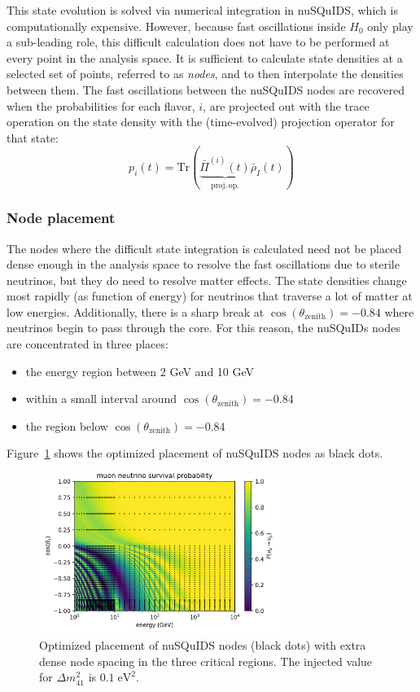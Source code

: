 This state evolution is solved via numerical integration in nuSQuIDS, which is computationally expensive. However, because fast oscillations inside $ H_0$ only play a sub-leading role, this difficult calculation does not have to be performed at every point in the analysis space. It is sufficient to calculate state densities at a selected set of points, referred to as \emph{nodes}, and to then interpolate the densities between them. The fast oscillations between the nuSQuIDS nodes are recovered when the probabilities for each flavor, $i$, are projected out with the trace operation on the state density with the (time-evolved) projection operator for that state:
$$
p_i(t)=\mathrm{Tr}(\underbrace{\bar{\Pi}^{(i)}(t)}_{\mathrm{proj.\,op.}}\bar{\rho}_I(t))
$$

\subsubsection{Node placement}
The nodes where the difficult state integration is calculated need not be placed dense enough in the analysis space to resolve the fast oscillations due to sterile neutrinos, but they do need to resolve matter effects. The state densities change most rapidly (as function of energy) for neutrinos that traverse a lot of matter at low energies. Additionally, there is a sharp break at $\cos(\theta_{\mathrm{zenith}})=-0.84$ where neutrinos begin to pass through the core. For this reason, the nuSQuIDs nodes are concentrated in three places:
\begin{itemize}
    \item the energy region between 2 GeV and 10 GeV
    \item within a small interval around $\cos(\theta_{\mathrm{zenith}})=-0.84$
    \item the region below $\cos(\theta_{\mathrm{zenith}})=-0.84$
\end{itemize}
Figure~\ref{fig:nusquids-nodes} shows the optimized placement of nuSQuIDS nodes as black dots.

\begin{figure}
    \centering
    \includegraphics[width=0.7\textwidth]{figures/measurement/sterile_analysis/nusquids/0.1eV_sterile_only_height_avg_optim_nodes.png}
    \caption{Optimized placement of nuSQuIDS nodes (black dots) with extra dense node spacing in the three critical regions. The injected value for $\Delta m^2_{41}$ is $0.1\;\mathrm{eV^2}$.}
    \label{fig:nusquids-nodes}
\end{figure}

